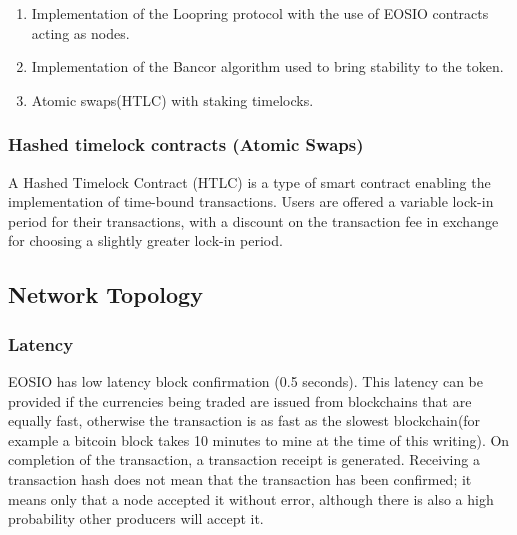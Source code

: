 \documentclass[]{article}
\begin{document}
{    \begin{enumerate} 
	\item Implementation of the Loopring protocol with the use of EOSIO contracts acting as nodes.\cite{7}
	\item Implementation of the Bancor algorithm used to bring stability to the token.\cite{10}
	\item Atomic swaps(HTLC) with staking timelocks. 
\end{enumerate}

\subsubsection{Hashed timelock contracts (Atomic Swaps)}
A Hashed Timelock Contract (HTLC)\cite{22} is a type of smart contract enabling the implementation of time-bound transactions.
Users are offered a variable lock-in period for their transactions, 
with a discount on the transaction fee in exchange for choosing a slightly greater lock-in period.

\subsection{Network Topology}


\subsubsection{Latency}    
EOSIO has low latency block confirmation (0.5 seconds).\cite{3}
This latency can be provided if the currencies being traded are issued from blockchains that are equally fast, otherwise the transaction is as fast as the slowest blockchain(for example a bitcoin block takes 10 minutes to mine at the time of this writing). 
On completion of the transaction, a transaction receipt is generated. 
Receiving a transaction hash does not mean that the transaction has been confirmed; it means only that a node accepted it without error, although there is also a high probability other producers will accept it. 

}
\end{document}

